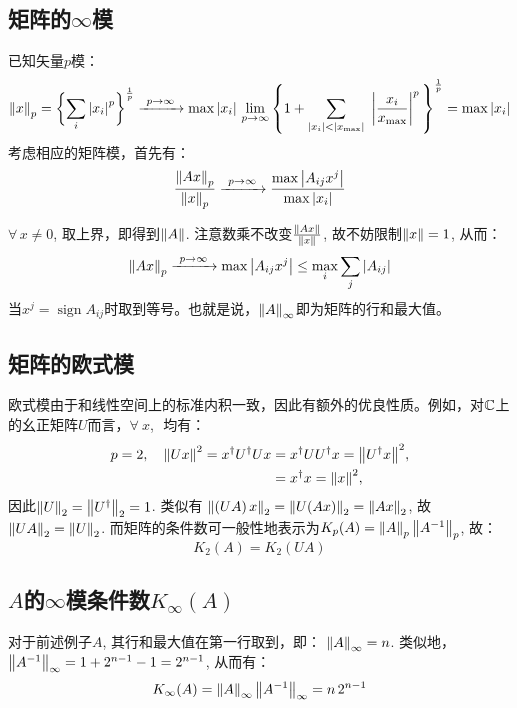 \documentclass[preview,10pt,border=8pt]{standalone}
\begin{document}
\subsection{矩阵的$\infty$模}
	已知矢量$p$模：
	\begin{equation}
		\norm{x}_p
		= \Bqty\bigg{\sum_i \abs{x_i}^p}^\frac{1}{p}
		\xrightarrow{\ p\to\infty\ }
		\max\abs{x_i}\,\lim\limits_{p\to\infty}
			\Bqty{1 + \sum_{
					\abs{x_i} < \abs{x_{\max}}}\ 
				\abs{\frac{x_i}{x_{\max}}}^p\,
			}^\frac{1}{p}
		= \max\abs{x_i}
	\end{equation}
	考虑相应的矩阵模，首先有：
	\begin{equation}
		\frac{\norm{Ax}_p}{\norm{x}_p}
		\xrightarrow{\ p\to\infty\ }
		\frac{\max\abs{A_{ij} x^j}}{\max\abs{x_i}}
	\end{equation}
	
	$\forall\, x\ne 0$, 取上界，即得到$\norm{A}$. 注意数乘不改变$\frac{\norm{Ax}}{\norm{x}}$, 故不妨限制$\norm{x} = 1$, 从而：
	\begin{equation}
		\norm{Ax}_p
		\xrightarrow{\ p\to\infty\ }
			\max\abs{A_{ij} x^j}
		\le \max_i \sum_j \abs{A_{ij}}
	\end{equation}
	当$x^j = \operatorname{sign} A_{ij}$时取到等号。也就是说，$\norm{A}_\infty$即为矩阵的行和最大值。
\subsection{矩阵的欧式模}
	欧式模由于和线性空间上的标准内积一致，因此有额外的优良性质。例如，对$\mathbb{C}$上的幺正矩阵$U$而言，$\forall\ x$,\,\ 均有：
	\begin{equation}
	\begin{aligned}
		p = 2,\quad
		\norm{Ux}^2
		= x^\dagger U^\dagger U x
		&= x^\dagger U U^\dagger x
			= \norm{U^\dagger x}^2, \\
		&= x^\dagger x
			= \norm{x}^2,
	\end{aligned}
	\end{equation}
	因此$\norm{U}_2 = \norm{U^\dagger}_2 = 1$. 类似有
		$\norm{(UA)\,x}_2
			= \norm{U(Ax)}_2
			= \norm{Ax}_2$, 
	故$\norm{UA}_2 = \norm{U}_2$. 而矩阵的条件数可一般性地表示为$K_p(A) = \norm{A}_p\,\norm{A^{-1}}_p$, 故：
	\begin{equation}
		K_2(A) = K_2(UA)
	\end{equation}
\subsection{$A$的$\infty$模条件数$K_{\infty}(A)$}
	对于前述例子$A$, 其行和最大值在第一行取到，即：
		$\norm{A}_\infty = n$. 
	类似地，$\norm{A^{-1}}_\infty = 1 + 2^{n-1} - 1
		= 2^{n-1}$, 从而有：
	\begin{equation}
		K_\infty(A)
		= \norm{A}_\infty\,\norm{A^{-1}}_\infty
		= n\,2^{n-1}
	\end{equation}
\end{document}
